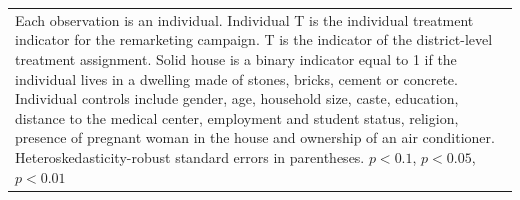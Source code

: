 {{\begin{tabular}{l*{5}{c}}
\hline\hline
\multicolumn{6}{p{0.85\linewidth}}{\scriptsize  Each observation is an individual. Individual T is the individual treatment indicator for the remarketing campaign. T is the indicator of the district-level treatment assignment. Solid house is a binary indicator equal to 1 if the individual lives in a dwelling made of stones, bricks, cement or concrete. Individual controls include gender, age, household size, caste, education, distance to the medical center, employment and student status, religion, presence of pregnant woman in the house and ownership of an air conditioner. Heteroskedasticity-robust standard errors in parentheses. \sym{*} \(p<0.1\), \sym{**} \(p<0.05\), \sym{***} \(p<0.01\)}\\
\end{tabular}
}%

}
